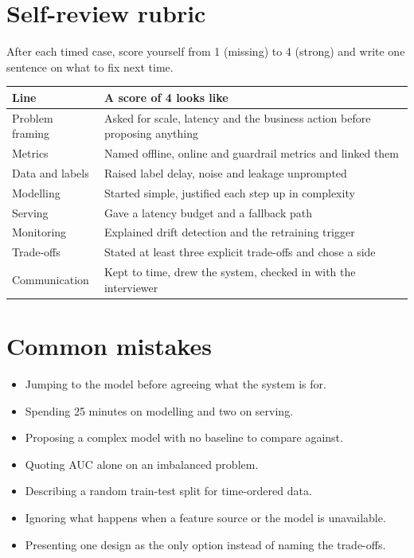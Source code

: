 \documentclass[10pt,a4paper]{article}
\begin{document}
\section{Self-review rubric}\label{sec:rubric}

After each timed case, score yourself from 1 (missing) to 4 (strong) and write
one sentence on what to fix next time.

\begin{center}
\begin{tabularx}{\textwidth}{@{}l Y@{}}
\toprule
\textbf{Line} & \textbf{A score of 4 looks like} \\
\midrule
Problem framing & Asked for scale, latency and the business action before
  proposing anything \\
Metrics & Named offline, online and guardrail metrics and linked them \\
Data and labels & Raised label delay, noise and leakage unprompted \\
Modelling & Started simple, justified each step up in complexity \\
Serving & Gave a latency budget and a fallback path \\
Monitoring & Explained drift detection and the retraining trigger \\
Trade-offs & Stated at least three explicit trade-offs and chose a side \\
Communication & Kept to time, drew the system, checked in with the
  interviewer \\
\bottomrule
\end{tabularx}
\end{center}

\section{Common mistakes}

\begin{itemize}
  \item Jumping to the model before agreeing what the system is for.
  \item Spending 25 minutes on modelling and two on serving.
  \item Proposing a complex model with no baseline to compare against.
  \item Quoting AUC alone on an imbalanced problem.
  \item Describing a random train-test split for time-ordered data.
  \item Ignoring what happens when a feature source or the model is
    unavailable.
  \item Presenting one design as the only option instead of naming the
    trade-offs.
\end{itemize}
\end{document}

